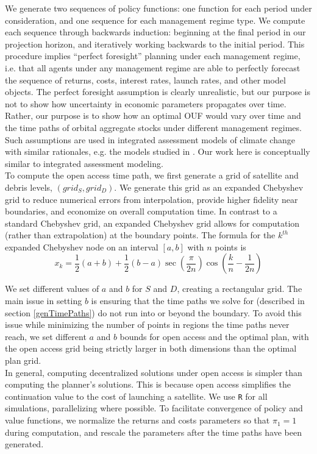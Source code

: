 \documentclass[9pt,twoside,lineno]{pnas-new}
\begin{document}
We generate two sequences of policy functions: one function for each period under consideration, and one sequence for each management regime type. We compute each sequence through backwards induction: beginning at the final period in our projection horizon, and iteratively working backwards to the initial period. This procedure implies ``perfect foresight'' planning under each management regime, i.e. that all agents under any management regime are able to perfectly forecast the sequence of returns, costs, interest rates, launch rates, and other model objects. The perfect foresight assumption is clearly unrealistic, but our purpose is not to show how uncertainty in economic parameters propagates over time. Rather, our purpose is to show how an optimal OUF would vary over time and the time paths of orbital aggregate stocks under different management regimes. Such assumptions are used in integrated assessment models of climate change with similar rationales, e.g. the models studied in \citet{kellykolstad1999, nordhaus2013, IAMsummary}. Our work here is conceptually similar to integrated assessment modeling. \\

To compute the open access time path, we first generate a grid of satellite and debris levels, $(grid_S,grid_D)$. We generate this grid as an expanded Chebyshev grid to reduce numerical errors from interpolation, provide higher fidelity near boundaries, and economize on overall computation time. In contrast to a standard Chebyshev grid, an expanded Chebyshev grid allows for computation (rather than extrapolation) at the boundary points. The formula for the $k^{th}$ expanded Chebyshev node on an interval $[a,b]$ with $n$ points is
\[ x_k = \frac{1}{2}(a+b) + \frac{1}{2}(b-a)\sec\left( \frac{\pi}{2n} \right) \cos\left( \frac{k}{n} - \frac{1}{2n} \right) \]

We set different values of $a$ and $b$ for $S$ and $D$, creating a rectangular grid. The main issue in setting $b$ is ensuring that the time paths we solve for (described in section \ref{genTimePaths}) do not run into or beyond the boundary. To avoid this issue while minimizing the number of points in regions the time paths never reach, we set different $a$ and $b$ bounds for open access and the optimal plan, with the open access grid being strictly larger in both dimensions than the optimal plan grid. \\ 

In general, computing decentralized solutions under open access is simpler than computing the planner's solutions. This is because open access simplifies the continuation value to the cost of launching a satellite. We use \texttt{R} for all simulations, parallelizing where possible. To facilitate convergence of policy and value functions, we normalize the returns and costs parameters so that $\pi_1 = 1$ during computation, and rescale the parameters after the time paths have been generated. \\
\end{document}
